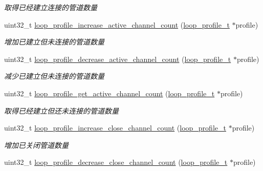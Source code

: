 \begin{DoxyCompactItemize}
\begin{DoxyCompactList}\small\item\em 取得已经建立连接的管道数量 \end{DoxyCompactList}\item 
uint32\+\_\+t \hyperlink{a00078_a60b6b1d29dcb8746bc44c90b8b438544_a60b6b1d29dcb8746bc44c90b8b438544}{loop\+\_\+profile\+\_\+increase\+\_\+active\+\_\+channel\+\_\+count} (\hyperlink{a00051_ad060e1396346d2f5db1ec0597376a107_ad060e1396346d2f5db1ec0597376a107}{loop\+\_\+profile\+\_\+t} $\ast$profile)
\begin{DoxyCompactList}\small\item\em 增加已建立但未连接的管道数量 \end{DoxyCompactList}\item 
uint32\+\_\+t \hyperlink{a00078_ab1bcbe8b5c4c4618605821581cdcaacd_ab1bcbe8b5c4c4618605821581cdcaacd}{loop\+\_\+profile\+\_\+decrease\+\_\+active\+\_\+channel\+\_\+count} (\hyperlink{a00051_ad060e1396346d2f5db1ec0597376a107_ad060e1396346d2f5db1ec0597376a107}{loop\+\_\+profile\+\_\+t} $\ast$profile)
\begin{DoxyCompactList}\small\item\em 减少已建立但未连接的管道数量 \end{DoxyCompactList}\item 
uint32\+\_\+t \hyperlink{a00078_a25e7659843c550c5d2147286ad1b48ae_a25e7659843c550c5d2147286ad1b48ae}{loop\+\_\+profile\+\_\+get\+\_\+active\+\_\+channel\+\_\+count} (\hyperlink{a00051_ad060e1396346d2f5db1ec0597376a107_ad060e1396346d2f5db1ec0597376a107}{loop\+\_\+profile\+\_\+t} $\ast$profile)
\begin{DoxyCompactList}\small\item\em 取得已经建立但还未连接的管道数量 \end{DoxyCompactList}\item 
uint32\+\_\+t \hyperlink{a00078_ae06a8af9d1d8e3b32a3ae6220aa904b2_ae06a8af9d1d8e3b32a3ae6220aa904b2}{loop\+\_\+profile\+\_\+increase\+\_\+close\+\_\+channel\+\_\+count} (\hyperlink{a00051_ad060e1396346d2f5db1ec0597376a107_ad060e1396346d2f5db1ec0597376a107}{loop\+\_\+profile\+\_\+t} $\ast$profile)
\begin{DoxyCompactList}\small\item\em 增加已关闭管道数量 \end{DoxyCompactList}\item 
uint32\+\_\+t \hyperlink{a00078_abae75de750f7969632e5e8087eb6c778_abae75de750f7969632e5e8087eb6c778}{loop\+\_\+profile\+\_\+decrease\+\_\+close\+\_\+channel\+\_\+count} (\hyperlink{a00051_ad060e1396346d2f5db1ec0597376a107_ad060e1396346d2f5db1ec0597376a107}{loop\+\_\+profile\+\_\+t} $\ast$profile)

\end{DoxyCompactItemize}
